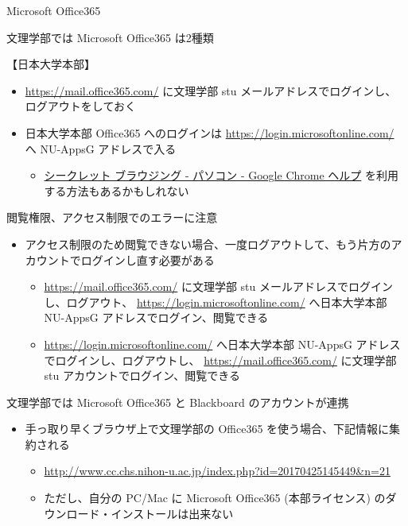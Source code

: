 \documentclass[a4j,10pt]{jsarticle}
\begin{document}
{\begin{frame}[label={sec:org6e73ec1},fragile]{Microsoft Office365}
\begin{block}{文理学部では Microsoft Office365 は2種類}
\begin{block}{【日本大学本部】}
\begin{itemize}
\item \url{https://mail.office365.com/} に文理学部 stu メールアドレスでログインし、ログアウトをしておく
\item 日本大学本部 Office365 へのログインは \url{https://login.microsoftonline.com/} へ NU-AppsG アドレスで入る
\begin{itemize}
\item \href{https://support.google.com/chrome/answer/95464?co=GENIE.Platform\%3DDesktop\&hl=ja}{シークレット ブラウジング - パソコン - Google Chrome ヘルプ} を利用する方法もあるかもしれない
\end{itemize}
\end{itemize}
\end{block}
\par
\begin{block}{閲覧権限、アクセス制限でのエラーに注意}
\begin{itemize}
\item アクセス制限のため閲覧できない場合、一度ログアウトして、もう片方のアカウントでログインし直す必要がある
\begin{itemize}
\item \url{https://mail.office365.com/} に文理学部 stu メールアドレスでログインし、ログアウト、 \url{https://login.microsoftonline.com/} へ日本大学本部 NU-AppsG アドレスでログイン、閲覧できる
\item \url{https://login.microsoftonline.com/} へ日本大学本部 NU-AppsG アドレスでログインし、ログアウトし、  \url{https://mail.office365.com/} に文理学部 stu アカウントでログイン、閲覧できる
\end{itemize}
\end{itemize}
\end{block}
\end{block}
\par
\begin{block}{文理学部では Microsoft Office365 と Blackboard のアカウントが連携}
\begin{itemize}
\item 手っ取り早くブラウザ上で文理学部の Office365 を使う場合、下記情報に集約される
\begin{itemize}
\item \url{http://www.cc.chs.nihon-u.ac.jp/index.php?id=20170425145449\&n=21}
\item ただし、自分の PC/Mac に Microsoft Office365 (本部ライセンス) のダウンロード・インストールは出来ない
\end{itemize}
\end{itemize}
\par
\begin{verbatim}


\end{verbatim}
\end{block}
\end{frame}}
\end{document}

